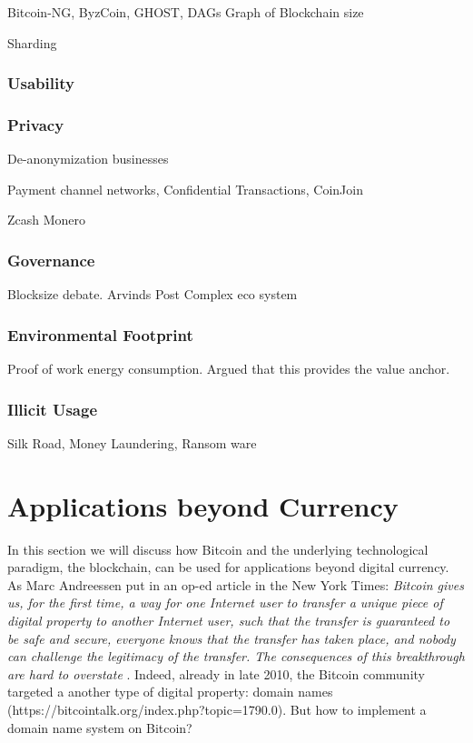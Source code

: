 Bitcoin-NG, ByzCoin, GHOST, DAGs
Graph of Blockchain size

Sharding

\subsubsection{Usability}



\subsubsection{Privacy}

De-anonymization
businesses

Payment channel networks, Confidential Transactions, CoinJoin

Zcash Monero


\subsubsection{Governance}

Blocksize debate.
Arvinds Post
Complex eco system



\subsubsection{Environmental Footprint}

Proof of work energy consumption. Argued that this provides the value anchor.


\subsubsection{Illicit Usage}

Silk Road, Money Laundering, Ransom ware


\section{Applications beyond Currency}
\label{sec:apps_beyond_currency}

In this section we will discuss how Bitcoin and the underlying technological paradigm, the blockchain, can be used for applications beyond digital currency. 
As Marc Andreessen put in an op-ed article in the New York Times: \emph{Bitcoin gives us, for the first time, a way for one Internet user to transfer a unique piece of digital property to another Internet user, such that the transfer is guaranteed to be safe and secure, everyone knows that the transfer has taken place, and nobody can challenge the legitimacy of the transfer. The consequences of this breakthrough are hard to overstate} \cite{andreessen2014}. Indeed, already in late 2010, the Bitcoin community targeted a another type of digital property: domain names (https://bitcointalk.org/index.php?topic=1790.0). But how to implement a domain name system on Bitcoin?

